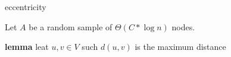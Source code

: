 
\begin{algorithm}[ht]
  \caption{eccentricity\label{alg}}
   Let $A$ be a random sample  of $\Theta(C * \log n)$ nodes.\\
\end{algorithm}
\textbf{lemma} leat $u,v\in V$ such $d(u,v)$ is the maximum distance 